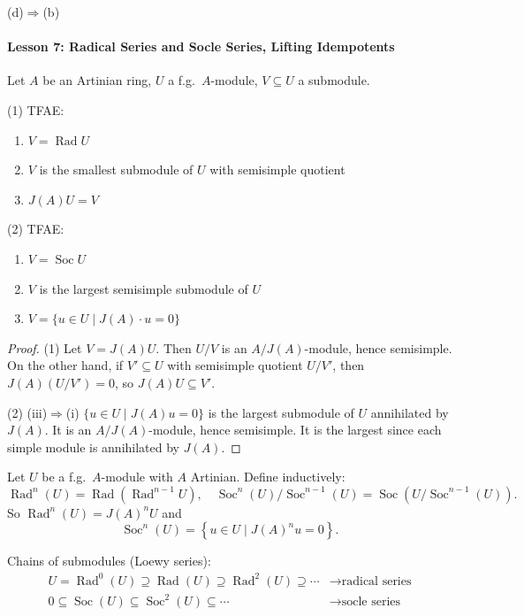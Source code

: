 \documentclass[11pt, a4paper]{report}
\begin{document}
(d)$\Rightarrow$(b)


\paragraph{Lesson 7: Radical Series and Socle Series, Lifting Idempotents}

\begin{proposition}
Let $A$ be an Artinian ring, $U$ a f.g.\ $A$-module, $V \subseteq U$ a submodule.

(1) TFAE:
\begin{enumerate}
\item[(i)] $V=\operatorname{Rad} U$
\item[(ii)] $V$ is the smallest submodule of $U$ with semisimple quotient
\item[(iii)] $J(A)U=V$
\end{enumerate}

(2) TFAE:
\begin{enumerate}
\item[(i)] $V=\operatorname{Soc} U$
\item[(ii)] $V$ is the largest semisimple submodule of $U$
\item[(iii)] $V=\{u \in U \mid J(A) \cdot u=0\}$
\end{enumerate}
\end{proposition}

\begin{proof}
(1) Let $V=J(A)U$. Then $U/V$ is an $A/J(A)$-module, hence semisimple. On the other hand, if $V' \subseteq U$ with semisimple quotient $U/V'$, then $J(A)(U/V')=0$, so $J(A)U \subseteq V'$.

(2)
(iii)$\Rightarrow$(i) $\{u \in U \mid J(A)u=0\}$ is the largest submodule of $U$ annihilated by $J(A)$. It is an $A/J(A)$-module, hence semisimple. It is the largest since each simple module is annihilated by $J(A)$.
\end{proof}

\begin{definition}
Let $U$ be a f.g.\ $A$-module with $A$ Artinian. Define inductively:
\[
\operatorname{Rad}^{n}(U)=\operatorname{Rad}\left(\operatorname{Rad}^{n-1}U\right), \quad
\operatorname{Soc}^{n}(U)/\operatorname{Soc}^{n-1}(U)=\operatorname{Soc}\left(U/\operatorname{Soc}^{n-1}(U)\right).
\]
So $\operatorname{Rad}^{n}(U)=J(A)^{n}U$ and
\[
\operatorname{Soc}^{n}(U)=\left\{u \in U \mid J(A)^{n} u=0\right\}.
\]

Chains of submodules (Loewy series):
\[
\begin{array}{ll}
U=\operatorname{Rad}^{0}(U) \supseteq \operatorname{Rad}(U) \supseteq \operatorname{Rad}^{2}(U) \supseteq \cdots & \rightarrow \text{radical series} \\
0 \subseteq \operatorname{Soc}(U) \subseteq \operatorname{Soc}^{2}(U) \subseteq \cdots & \rightarrow \text{socle series}
\end{array}
\]
\end{definition}
\end{document}

